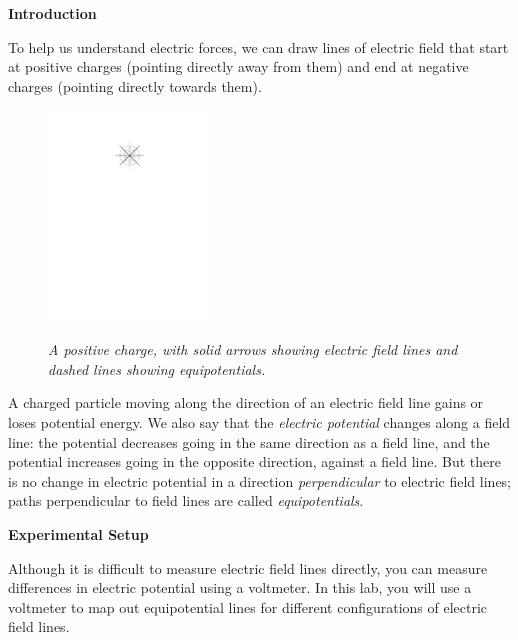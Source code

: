 
\textbf{Introduction}

To help us understand electric forces, we can draw lines of electric field that start at positive charges (pointing directly away from them) and end at negative charges (pointing directly towards them).  


{\setlength{\columnsep}{0.4in}%
\begin{figure}
\vspace{-0.2in}
{\centering \includegraphics[width=1.7in]{electric_fields_and_equipotential_lines/field_and_potential.pdf} \par}

\textit{\small{A positive charge, with solid arrows showing electric field lines and dashed lines showing equipotentials.}}
\end{figure}

A charged particle moving along the direction of an electric field line gains or loses potential energy.  We also say that the \textit{electric potential} changes along a field line: the potential decreases going in the same direction as a field line, and the potential increases going in the opposite direction, against a field line.  But there is no change in electric potential in a direction \textit{perpendicular} to electric field lines; paths perpendicular to field lines are called \textit{equipotentials}.

\bigskip

\textbf{Experimental Setup}


Although it is difficult to measure electric field lines directly, you can measure differences in electric potential using a voltmeter.  In this lab, you will use a voltmeter to map out equipotential lines for different configurations of electric field lines.  

}%

